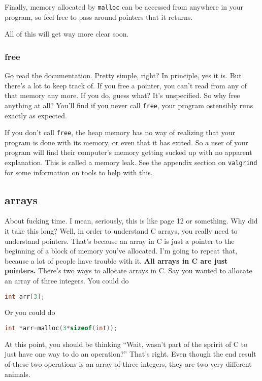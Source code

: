 \documentclass[ebook,11pt,oneside,openany]{memoir}
\begin{document}
Finally, memory allocated by \texttt{malloc} can be accessed from anywhere in your program, so feel free to pass around pointers that it returns.

All of this will get way more clear soon.

\subsubsection{free}
Go read the documentation. Pretty simple, right? In principle, yes it is. But there's a lot to keep track of. If you free a pointer, you can't read from any of that memory any more. If you do, guess what? It's unspecified. So why free anything at all? You'll find if you never call \texttt{free}, your program ostensibly runs exactly as expected.

If you don't call \texttt{free}, the heap memory has no way of realizing that your program is done with its memory, or even that it has exited. So a user of your program will find their computer's memory getting sucked up with no apparent explanation. This is called a memory leak. See the appendix section on \texttt{valgrind} for some information on tools to help with this.

\subsection{arrays}

About fucking time. I mean, seriously, this is like page 12 or something. Why did it take this long? Well, in order to understand C arrays, you really need to understand pointers. That's because an array in C is just a pointer to the beginning of a block of memory you've allocated. I'm going to repeat that, because a lot of people have trouble with it. \textbf{All arrays in C are just pointers.}
There's two ways to allocate arrays in C. Say you wanted to allocate an array of three integers. You could do

\begin{lstlisting}[language=C]
int arr[3];
\end{lstlisting}

Or you could do

\begin{lstlisting}[language=C]
int *arr=malloc(3*sizeof(int));
\end{lstlisting}

At this point, you should be thinking ``Wait, wasn't part of the spririt of C to just have one way to do an operation?'' That's right. Even though the end result of these two operations is an array of three integers, they are two very different animals.
\end{document}
